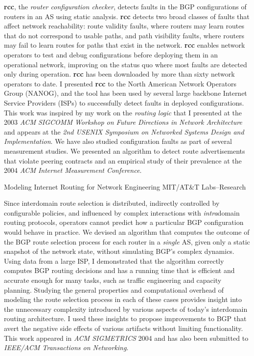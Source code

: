 \documentclass{article}
\begin{document}
\begin{cv}{}
    {\bf rcc}, the {\em router configuration
    checker}, detects faults in the BGP configurations of
    routers in an AS using static analysis. {\bf rcc} detects two broad
    classes of faults that affect network reachability: route validity
    faults, where routers may learn routes that do not correspond to
    usable paths, and path visibility faults, where routers may fail to
    learn routes for paths that exist in the network.  {\bf rcc} enables
    network operators to test and debug configurations before deploying
    them in an operational network, improving on the status quo where
    most faults are detected only during operation.  {\bf rcc} has been
    downloaded by more than sixty network operators to date.  
    I presented {\bf rcc} to the North American Network Operators Group
    (NANOG), and the tool has been used by several large backbone
    Internet Service Providers (ISPs)
    to successfully detect faults in deployed configurations.  This
    work was inspired by my work on the {\em routing logic} that I
    presented at the 2003 {\em ACM SIGCOMM Workshop on Future Directions
    in Network Architecture} and appears at the {\em 2nd
    USENIX Symposium on Networked Systems Design and Implementation}.
    We have also studied configuration faults as part of several
    measurement studies.  We presented an algorithm to detect route
    advertisements that violate peering contracts and an empirical study
    of their prevalence at the 2004 {\em ACM Internet Measurement
    Conference}. 


{\mf Modeling Internet Routing for Network Engineering} \hfill MIT/AT\&T Labs--Research
\vspace*{-0.1in}

    Since interdomain route selection is distributed, indirectly
    controlled by configurable policies, and influenced by complex
    interactions with {\em intra}domain routing protocols, operators
    cannot predict how a particular BGP configuration would behave in
    practice.  We devised an algorithm that computes the outcome of the
    BGP route selection process for each router in a {\em single} AS,
    given only a static snapshot of the network state, without
    simulating BGP's complex dynamics.  Using data from a large ISP, I
    demonstrated that the algorithm correctly computes BGP routing
    decisions and has a running time that is efficient and accurate
    enough for many tasks, such as traffic engineering and capacity
    planning.  Studying the general properties and computational
    overhead of modeling the route selection process in each of these
    cases provides insight into the unnecessary complexity introduced
    by various aspects of today's interdomain routing architecture.  I
    used these insights to propose improvements to BGP that avert the
    negative side effects of various artifacts without limiting
    functionality.  This work appeared in {\em
    ACM SIGMETRICS} 2004 and has also been submitted to {\em IEEE/ACM
    Transactions on Networking}.


\end{cv}
\end{document}
